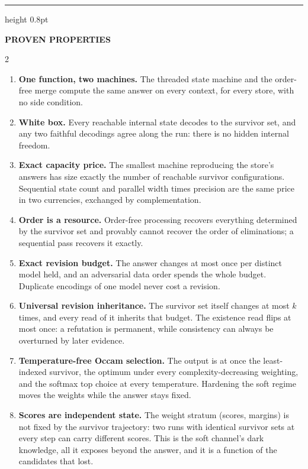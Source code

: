 \documentclass[10pt,a4paper]{article}
\begin{document}
{\color{ink}\hrule height 0.8pt}
\vspace{4pt}
\begin{center}\textbf{PROVEN PROPERTIES}\end{center}
\vspace{-7pt}
\footnotesize
\begin{multicols}{2}
\begin{enumerate}[label=\textbf{P\arabic*.},leftmargin=2.1em,itemsep=0.7pt,parsep=0pt]
\item \textbf{One function, two machines.} The threaded state machine and the order-free merge compute the same answer on every context, for every store, with no side condition.
\item \textbf{White box.} Every reachable internal state decodes to the survivor set, and any two faithful decodings agree along the run: there is no hidden internal freedom.
\item \textbf{Exact capacity price.} The smallest machine reproducing the store's answers has size exactly the number of reachable survivor configurations. Sequential state count and parallel width times precision are the same price in two currencies, exchanged by complementation.
\item \textbf{Order is a resource.} Order-free processing recovers everything determined by the survivor set and provably cannot recover the order of eliminations; a sequential pass recovers it exactly.
\item \textbf{Exact revision budget.} The answer changes at most once per distinct model held, and an adversarial data order spends the whole budget. Duplicate encodings of one model never cost a revision.
\item \textbf{Universal revision inheritance.} The survivor set itself changes at most $k$ times, and every read of it inherits that budget. The existence read flips at most once: a refutation is permanent, while consistency can always be overturned by later evidence.
\item \textbf{Temperature-free Occam selection.} The output is at once the least-indexed survivor, the optimum under every complexity-decreasing weighting, and the softmax top choice at every temperature. Hardening the soft regime moves the weights while the answer stays fixed.
\item \textbf{Scores are independent state.} The weight stratum (scores, margins) is not fixed by the survivor trajectory: two runs with identical survivor sets at every step can carry different scores. This is the soft channel's dark knowledge, all it exposes beyond the answer, and it is a function of the candidates that lost.

\end{enumerate}
\end{multicols}
\end{document}

